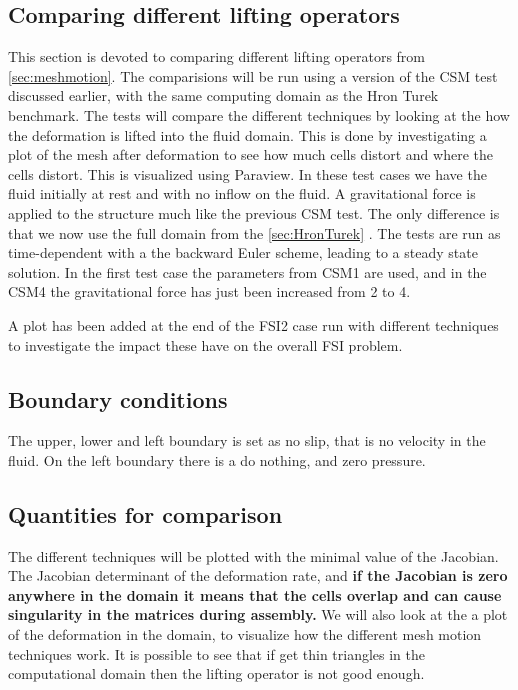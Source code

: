 \subsection{Comparing different lifting operators}\label{sec:mesh_motion}
This section is devoted to comparing different lifting operators from \ref{sec:meshmotion}. The comparisions will be run using a version of the CSM test discussed earlier, with the same computing domain as the Hron Turek benchmark. The tests will compare the different techniques by looking at the how the deformation is lifted into the fluid domain. This is done by investigating a plot of the mesh after deformation to see how much cells distort and where the cells distort. This is visualized using Paraview.\newline
In these test cases we have the fluid initially at rest and with no inflow on the fluid. A gravitational force is applied to the structure much like the previous CSM test. The only difference is that we now use the full domain from the \ref{sec:HronTurek} . The tests are run as time-dependent with a the backward Euler scheme, leading to a steady state solution. In the first test case the parameters from CSM1 are used, and in the CSM4 the gravitational force has just been increased from 2 to 4. \newline

A plot has been added at the end of the FSI2 case run with different techniques to investigate the impact these have on the overall FSI problem.

\subsection*{Boundary conditions}
The upper, lower and left boundary is set as no slip, that is no velocity in the fluid. On the left boundary there is a do nothing, and zero pressure. 
\subsection*{Quantities for comparison}
The different techniques will be plotted with the minimal value of the Jacobian. The Jacobian determinant of the deformation rate, and \textbf{if the Jacobian is zero anywhere in the domain it means that the cells overlap and can cause singularity in the matrices during assembly.} \newline
We will also look at the a plot of the deformation in the domain, to visualize how the different mesh motion techniques work. It is possible to see that if get thin triangles in the computational domain then the lifting operator is not good enough.
